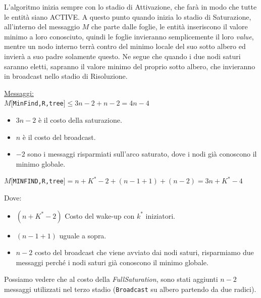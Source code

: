 L'algoritmo inizia sempre con lo stadio di Attivazione, che farà in modo che
tutte le entità siano ACTIVE. A questo punto quando inizia lo stadio di
Saturazione, all'interno del messaggio $M$ che parte dalle foglie, le entità
inseriscono il valore minimo a loro conosciuto, quindi le foglie invieranno
semplicemente il loro \textit{value}, mentre un nodo interno terrà contro del minimo locale
del suo sotto albero ed invierà a suo padre solamente questo. Ne segue che
quando i due nodi saturi saranno eletti, sapranno il valore minimo del proprio
sotto albero, che invieranno in broadcast nello stadio di Risoluzione.


\underline{Messaggi:}\\
$M[$\texttt{MinFind,R,tree}$] \leq 3n - 2 + n - 2 = 4n - 4$
\begin{itemize}
    \item $3n - 2$ è il costo della saturazione.
    \item $n$ è il costo del broadcast.
    \item $-2$ sono i messaggi risparmiati sull'arco saturato, dove i nodi già
          conoscono il minimo globale.
\end{itemize}

\begin{center}
    $M[$\texttt{MINFIND,R,tree}$] = n + K^* - 2 + (n-1+1) + (n-2) = 3n + K^* -
        4$\\
\end{center}
Dove:
\begin{itemize}
    \item $(n + K^* - 2)$ Costo del wake-up con $k^*$ iniziatori.
    \item $(n-1+1)$ uguale a sopra.
    \item $n-2$ costo del broadcast che viene avviato dai nodi saturi, risparmiamo
          due messaggi perché i nodi saturi già conoscono il minimo globale.
\end{itemize}
Possiamo vedere che al costo della \textit{FullSaturation}, sono stati aggiunti
$n-2$ messaggi utilizzati nel terzo stadio (\texttt{Broadcast} su albero
partendo da due radici).


